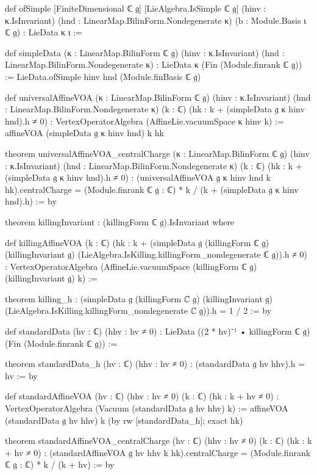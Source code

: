 \documentclass[11pt,openany]{book}
\theoremstyle{definition}
\theoremstyle{plain}
\begin{document}
\begin{leancode}
def ofSimple [FiniteDimensional ℂ 𝔤] [LieAlgebra.IsSimple ℂ 𝔤] (hinv : κ.IsInvariant)
    (hnd : LinearMap.BilinForm.Nondegenerate κ) (b : Module.Basis ι ℂ 𝔤) : LieData κ ι :=

def simpleData (κ : LinearMap.BilinForm ℂ 𝔤) (hinv : κ.IsInvariant)
    (hnd : LinearMap.BilinForm.Nondegenerate κ) : LieData κ (Fin (Module.finrank ℂ 𝔤)) :=
  LieData.ofSimple hinv hnd (Module.finBasis ℂ 𝔤)

def universalAffineVOA (κ : LinearMap.BilinForm ℂ 𝔤) (hinv : κ.IsInvariant)
    (hnd : LinearMap.BilinForm.Nondegenerate κ) (k : ℂ) (hk : k + (simpleData 𝔤 κ hinv hnd).h ≠ 0) :
    VertexOperatorAlgebra (AffineLie.vacuumSpace κ hinv k) :=
  affineVOA (simpleData 𝔤 κ hinv hnd) k hk

theorem universalAffineVOA_centralCharge (κ : LinearMap.BilinForm ℂ 𝔤) (hinv : κ.IsInvariant)
    (hnd : LinearMap.BilinForm.Nondegenerate κ) (k : ℂ) (hk : k + (simpleData 𝔤 κ hinv hnd).h ≠ 0) :
    (universalAffineVOA 𝔤 κ hinv hnd k hk).centralCharge =
      (Module.finrank ℂ 𝔤 : ℂ) * k / (k + (simpleData 𝔤 κ hinv hnd).h) := by

theorem killingInvariant : (killingForm ℂ 𝔤).IsInvariant where

def killingAffineVOA (k : ℂ)
    (hk : k + (simpleData 𝔤 (killingForm ℂ 𝔤) (killingInvariant 𝔤)
      (LieAlgebra.IsKilling.killingForm_nondegenerate ℂ 𝔤)).h ≠ 0) :
    VertexOperatorAlgebra (AffineLie.vacuumSpace (killingForm ℂ 𝔤) (killingInvariant 𝔤) k) :=

theorem killing_h :
    (simpleData 𝔤 (killingForm ℂ 𝔤) (killingInvariant 𝔤)
      (LieAlgebra.IsKilling.killingForm_nondegenerate ℂ 𝔤)).h = 1 / 2 := by

def standardData (hv : ℂ) (hhv : hv ≠ 0) :
    LieData ((2 * hv)⁻¹ • killingForm ℂ 𝔤) (Fin (Module.finrank ℂ 𝔤)) :=

theorem standardData_h (hv : ℂ) (hhv : hv ≠ 0) :
    (standardData 𝔤 hv hhv).h = hv := by

def standardAffineVOA (hv : ℂ) (hhv : hv ≠ 0) (k : ℂ) (hk : k + hv ≠ 0) :
    VertexOperatorAlgebra (Vacuum (standardData 𝔤 hv hhv) k) :=
  affineVOA (standardData 𝔤 hv hhv) k (by rw [standardData_h]; exact hk)

theorem standardAffineVOA_centralCharge (hv : ℂ) (hhv : hv ≠ 0) (k : ℂ)
    (hk : k + hv ≠ 0) :
    (standardAffineVOA 𝔤 hv hhv k hk).centralCharge = (Module.finrank ℂ 𝔤 : ℂ) * k / (k + hv) := by
\end{leancode}
\end{document}
